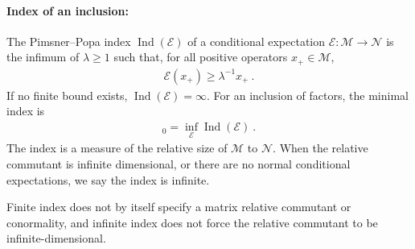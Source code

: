 \documentclass[a4paper,11pt]{article}
\theoremstyle{definition}
\newcommand{\mN}{\mathcal{N}}
\newcommand{\mM}{\mathcal{M}}
\newcommand{\mE}{\mathcal{E}}
\begin{document}
\paragraph{Index of an inclusion:} The Pimsner--Popa index $\operatorname{Ind}(\mE)$ of a conditional expectation $\mE:\mM\to \mN$ is the infimum of $\lambda\geq1$ such that, for all positive operators $x_+\in\mM$,
\begin{align}
    \mE(x_+)\geq \lambda^{-1}x_+\ .
\end{align}
If no finite bound exists, $\operatorname{Ind}(\mE)=\infty$. For an inclusion of factors, the minimal index is
\begin{align}
    [\mM:\mN]_0=\inf_\mE \operatorname{Ind}(\mE)\ .
\end{align}
The index is a measure of the relative size of $\mM$ to $\mN$. When the relative commutant is infinite dimensional, or there are no normal conditional expectations, we say the index is infinite.

Finite index does not by itself specify a matrix relative commutant or conormality, and infinite index does not force the relative commutant to be infinite-dimensional.
\end{document}
